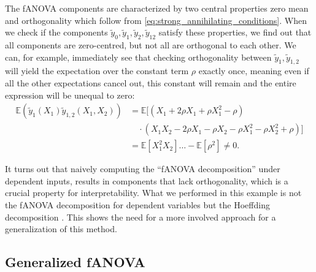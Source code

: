 The fANOVA components are characterized by two central properties zero mean and orthogonality which follow from \autoref{eq:strong_annihilating_conditions}.
When we check if the components $\tilde{y}_0, \tilde{y}_1, \tilde{y}_2, \tilde{y}_{12}$ satisfy these properties, we find out that all components are zero-centred, but not all are orthogonal to each other. We can, for example, immediately see that checking orthogonality between $\tilde{y}_{1}, \tilde{y}_{1,2}$ will yield the expectation over the constant term $\rho$ exactly once, meaning even if all the other expectations cancel out, this constant will remain and the entire expression will be unequal to zero:
\begin{align*}
    \mathbb{E}(\tilde{y}_1(X_1)\tilde{y}_{1,2}(X_1, X_2)) 
    &= \mathbb{E}[(X_1 + 2\rho X_1 + \rho X_1^2 - \rho) \\
    &\quad \cdot (X_1 X_2 - 2\rho X_1 - \rho X_2 - \rho X_1^2 - \rho X_2^2 + \rho)] \\
    &= \mathbb{E}[X_{1}^2X_2] \ldots - \mathbb{E}[\rho^2] \neq 0.
\end{align*}

It turns out that naively computing the ``fANOVA decomposition'' under dependent inputs, results in components that lack orthogonality, which is a crucial property for interpretability.
What we performed in this example is not the fANOVA decomposition for dependent variables but the Hoeffding decomposition \citep{hoeffding1948}.
This shows the need for a more involved approach for a generalization of this method.

\subsection{Generalized fANOVA}

